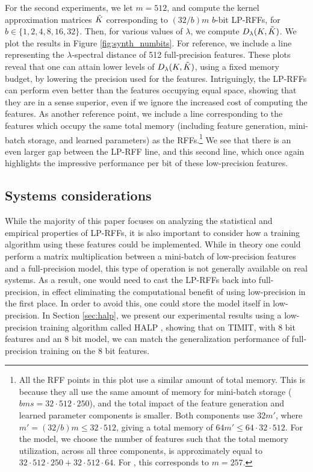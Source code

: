 For the second experiments, we let $m = 512$, and compute the kernel approximation matrices $\tilde{K}$ corresponding to $(32/b)m$ $b$-bit LP-RFFs, for $b \in \{1,2,4,8,16,32\}$. Then, for various values of $\lambda$, we compute $D_{\lambda}(K,\tilde{K})$. We plot the results in Figure \ref{fig:synth_numbits}.  For reference, we include a line representing the $\lambda$-spectral distance of 512 full-precision \Nystrom features. These plots reveal that one can attain lower levels of $D_{\lambda}(K,\tilde{K})$, using a fixed memory budget, by lowering the precision used for the features. Intriguingly, the LP-RFFs can perform even better than the \Nystrom features occupying equal space, showing that they are in a sense superior, even if we ignore the increased cost of computing the \Nystrom features. As another reference point, we include a line corresponding to the \Nystrom features which occupy the same total memory (including feature generation, mini-batch storage, and learned parameters) as the RFFs.\footnote{All the RFF points in this plot use a similar amount of total memory. This is because they all use the same amount of memory for mini-batch storage ($bms = 32 \cdot 512 \cdot 250$), and the total impact of the feature generation and learned parameter components is smaller.  Both components use $32m'$, where $m' = (32/b)m \leq 32 \cdot 512$, giving a total memory of $64m' \leq 64 \cdot 32\cdot 512$.  For the \Nystrom model, we choose the number of features such that the total memory utilization, across all three components, is approximately equal to $32 \cdot 512 \cdot 250 + 32\cdot 512\cdot 64$.  For \Nystrom, this corresponds to $m = 257$.}  We see that there is an even larger gap between the LP-RFF line, and this second \Nystrom line, which once again highlights the impressive performance per bit of these low-precision features.

\subsection{Systems considerations}
While the majority of this paper focuses on analyzing the statistical and empirical properties of LP-RFFs, it is also important to consider how a training algorithm using these features could be implemented. While in theory one could perform a matrix multiplication between a mini-batch of low-precision features and a full-precision model, this type of operation is not generally available on real systems. As a result, one would need to cast the LP-RFFs back into full-precision, in effect eliminating the computational benefit of using low-precision in the first place.  In order to avoid this, one could store the model itself in low-precision. In Section \ref{sec:halp}, we present our experimental results using a low-precision training algorithm called HALP \citep{halp18}, showing that on TIMIT, with 8 bit features and an 8 bit model, we can match the generalization performance of full-precision training on the 8 bit features.

